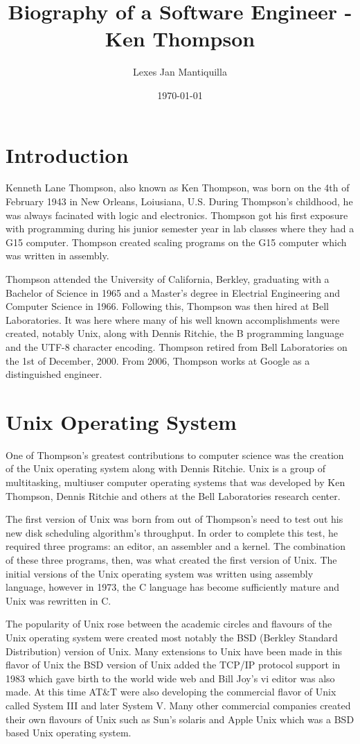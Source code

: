 \documentclass{article}
\title{Biography of a Software Engineer - Ken Thompson}
\author{Lexes Jan Mantiquilla}
\date{\today}
\begin{document}
\maketitle

\section{Introduction}
Kenneth Lane Thompson, also known as Ken Thompson, was born on the 4th of
February 1943 in New Orleans, Loiusiana, U.S. During Thompson's childhood, he
was always facinated with logic and electronics. Thompson got his first
exposure with programming during his junior semester year in lab classes
where they had a G15 computer. Thompson created scaling programs on the G15
computer which was written in assembly. \cite{seibel2009coders}

Thompson attended the University of California, Berkley, graduating with a
Bachelor of Science in 1965 and a Master's degree in Electrial Engineering and
Computer Science in 1966. Following this, Thompson was then hired at Bell
Laboratories. It was here where many of his well known accomplishments were
created, notably Unix, along with Dennis Ritchie, the B programming language and
the UTF-8 character encoding. Thompson retired from Bell Laboratories on the
1st of December, 2000. \cite{linfo} From 2006, Thompson works at Google as a
distinguished engineer.

\section{Unix Operating System}
One of Thompson's greatest contributions to computer science was the creation
of the Unix operating system along with Dennis Ritchie. Unix is a group of
multitasking, multiuser computer operating systems that was developed by Ken
Thompson, Dennis Ritchie and others at the Bell Laboratories research center.

The first version of Unix was born from out of Thompson's need to test out his
new disk scheduling algorithm's throughput. In order to complete this test, he
required three programs: an editor, an assembler and a kernel. The combination
of these three programs, then, was what created the first version of Unix.
\cite{VCF} The initial versions of the Unix operating system was written using
assembly language, however in 1973, the C language has become sufficiently
mature and Unix was rewritten in C. \cite{ritchie1979evolution}

The popularity of Unix rose between the academic circles and flavours of the
Unix operating system were created most notably the BSD (Berkley Standard
Distribution) version of Unix. Many extensions to Unix have been made in this
flavor of Unix the BSD version of Unix added the TCP/IP protocol support in
1983 \cite{unixorg} which gave birth to the world wide web and Bill Joy's vi
editor was also made. At this time AT\&T were also developing the commercial
flavor of Unix called System III and later System V. Many other commercial
companies created their own flavours of Unix such as Sun's solaris and Apple
Unix which was a BSD based Unix operating system.
\end{document}
